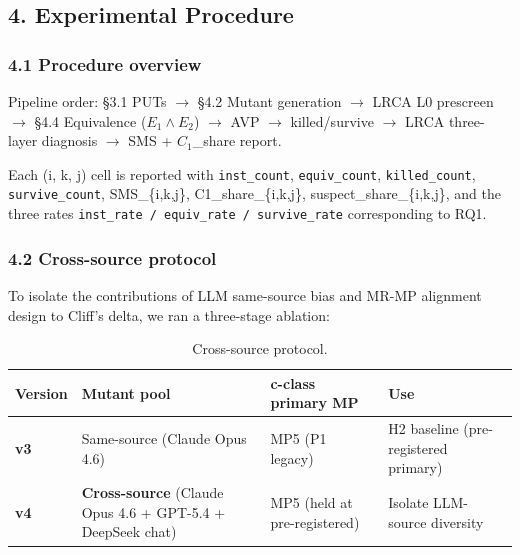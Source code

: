 \documentclass[review,12pt,authoryear]{elsarticle}
\begin{document}

\subsection{4. Experimental Procedure}\label{experimental-procedure}

\subsubsection{4.1 Procedure overview}\label{procedure-overview}

\noindent\textsf{\small Pipeline order: §3.1 PUTs $\to$ §4.2 Mutant generation $\to$ LRCA L0 prescreen $\to$ §4.4 Equivalence ($E_1 \wedge E_2$) $\to$ AVP $\to$ killed/survive $\to$ LRCA three-layer diagnosis $\to$ SMS + $C_1$\_share report.}

Each (i, k, j) cell is reported with \texttt{inst\_count},
\texttt{equiv\_count}, \texttt{killed\_count}, \texttt{survive\_count},
SMS\_\{i,k,j\}, C1\_share\_\{i,k,j\}, suspect\_share\_\{i,k,j\}, and the
three rates \texttt{inst\_rate\ /\ equiv\_rate\ /\ survive\_rate}
corresponding to RQ1.

\subsubsection{4.2 Cross-source protocol}\label{cross-source-v4-protocol-summary}

To isolate the contributions of LLM same-source bias and MR-MP alignment
design to Cliff's delta, we ran a three-stage ablation:

{\def\LTcaptype{table} %
\begin{longtable}[]{@{}
  >{\raggedright\arraybackslash}p{}
  >{\raggedright\arraybackslash}p{}
  >{\raggedright\arraybackslash}p{}
  >{\raggedright\arraybackslash}p{}@{}}
\caption{Cross-source protocol.}\label{tab:p2-06}\\
\toprule\noalign{}
\begin{minipage}[b]{\linewidth}\raggedright
Version
\end{minipage} & \begin{minipage}[b]{\linewidth}\raggedright
Mutant pool
\end{minipage} & \begin{minipage}[b]{\linewidth}\raggedright
c-class primary MP
\end{minipage} & \begin{minipage}[b]{\linewidth}\raggedright
Use
\end{minipage} \\
\midrule\noalign{}
\endhead
\bottomrule\noalign{}
\endlastfoot
\textbf{v3} & Same-source (Claude Opus 4.6) & MP5 (P1 legacy) & H2
baseline (pre-registered primary) \\
\textbf{v4} & \textbf{Cross-source} (Claude Opus 4.6 + GPT-5.4 +
DeepSeek chat) & MP5 (held at pre-registered) & Isolate LLM-source
diversity \\
\end{longtable}
}
\end{document}
